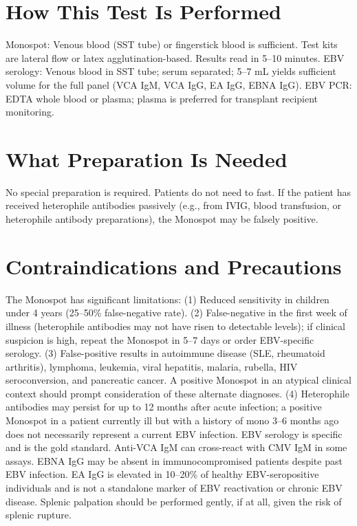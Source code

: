 \section*{How This Test Is Performed}
Monospot: Venous blood (SST tube) or fingerstick blood is sufficient. Test kits are lateral flow or latex agglutination-based. Results read in 5--10 minutes. EBV serology: Venous blood in SST tube; serum separated; 5--7 mL yields sufficient volume for the full panel (VCA IgM, VCA IgG, EA IgG, EBNA IgG). EBV PCR: EDTA whole blood or plasma; plasma is preferred for transplant recipient monitoring.

\section*{What Preparation Is Needed}
No special preparation is required. Patients do not need to fast. If the patient has received heterophile antibodies passively (e.g., from IVIG, blood transfusion, or heterophile antibody preparations), the Monospot may be falsely positive.

\section*{Contraindications and Precautions}
The Monospot has significant limitations: (1) Reduced sensitivity in children under 4 years (25--50\% false-negative rate). (2) False-negative in the first week of illness (heterophile antibodies may not have risen to detectable levels); if clinical suspicion is high, repeat the Monospot in 5--7 days or order EBV-specific serology. (3) False-positive results in autoimmune disease (SLE, rheumatoid arthritis), lymphoma, leukemia, viral hepatitis, malaria, rubella, HIV seroconversion, and pancreatic cancer. A positive Monospot in an atypical clinical context should prompt consideration of these alternate diagnoses. (4) Heterophile antibodies may persist for up to 12 months after acute infection; a positive Monospot in a patient currently ill but with a history of mono 3--6 months ago does not necessarily represent a current EBV infection. EBV serology is specific and is the gold standard. Anti-VCA IgM can cross-react with CMV IgM in some assays. EBNA IgG may be absent in immunocompromised patients despite past EBV infection. EA IgG is elevated in 10--20\% of healthy EBV-seropositive individuals and is not a standalone marker of EBV reactivation or chronic EBV disease. Splenic palpation should be performed gently, if at all, given the risk of splenic rupture.

